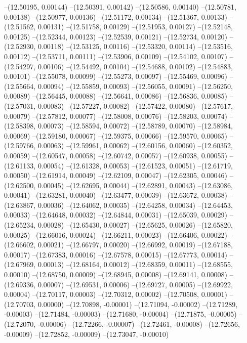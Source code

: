 --(12.50195, 0.00144)
--(12.50391, 0.00142)
--(12.50586, 0.00140)
--(12.50781, 0.00138)
--(12.50977, 0.00136)
--(12.51172, 0.00134)
--(12.51367, 0.00133)
--(12.51562, 0.00131)
--(12.51758, 0.00129)
--(12.51953, 0.00127)
--(12.52148, 0.00125)
--(12.52344, 0.00123)
--(12.52539, 0.00121)
--(12.52734, 0.00120)
--(12.52930, 0.00118)
--(12.53125, 0.00116)
--(12.53320, 0.00114)
--(12.53516, 0.00112)
--(12.53711, 0.00111)
--(12.53906, 0.00109)
--(12.54102, 0.00107)
--(12.54297, 0.00106)
--(12.54492, 0.00104)
--(12.54688, 0.00102)
--(12.54883, 0.00101)
--(12.55078, 0.00099)
--(12.55273, 0.00097)
--(12.55469, 0.00096)
--(12.55664, 0.00094)
--(12.55859, 0.00093)
--(12.56055, 0.00091)
--(12.56250, 0.00089)
--(12.56445, 0.00088)
--(12.56641, 0.00086)
--(12.56836, 0.00085)
--(12.57031, 0.00083)
--(12.57227, 0.00082)
--(12.57422, 0.00080)
--(12.57617, 0.00079)
--(12.57812, 0.00077)
--(12.58008, 0.00076)
--(12.58203, 0.00074)
--(12.58398, 0.00073)
--(12.58594, 0.00072)
--(12.58789, 0.00070)
--(12.58984, 0.00069)
--(12.59180, 0.00067)
--(12.59375, 0.00066)
--(12.59570, 0.00065)
--(12.59766, 0.00063)
--(12.59961, 0.00062)
--(12.60156, 0.00060)
--(12.60352, 0.00059)
--(12.60547, 0.00058)
--(12.60742, 0.00057)
--(12.60938, 0.00055)
--(12.61133, 0.00054)
--(12.61328, 0.00053)
--(12.61523, 0.00051)
--(12.61719, 0.00050)
--(12.61914, 0.00049)
--(12.62109, 0.00047)
--(12.62305, 0.00046)
--(12.62500, 0.00045)
--(12.62695, 0.00044)
--(12.62891, 0.00043)
--(12.63086, 0.00041)
--(12.63281, 0.00040)
--(12.63477, 0.00039)
--(12.63672, 0.00038)
--(12.63867, 0.00036)
--(12.64062, 0.00035)
--(12.64258, 0.00034)
--(12.64453, 0.00033)
--(12.64648, 0.00032)
--(12.64844, 0.00031)
--(12.65039, 0.00029)
--(12.65234, 0.00028)
--(12.65430, 0.00027)
--(12.65625, 0.00026)
--(12.65820, 0.00025)
--(12.66016, 0.00024)
--(12.66211, 0.00023)
--(12.66406, 0.00022)
--(12.66602, 0.00021)
--(12.66797, 0.00020)
--(12.66992, 0.00019)
--(12.67188, 0.00017)
--(12.67383, 0.00016)
--(12.67578, 0.00015)
--(12.67773, 0.00014)
--(12.67969, 0.00013)
--(12.68164, 0.00012)
--(12.68359, 0.00011)
--(12.68555, 0.00010)
--(12.68750, 0.00009)
--(12.68945, 0.00008)
--(12.69141, 0.00008)
--(12.69336, 0.00007)
--(12.69531, 0.00006)
--(12.69727, 0.00005)
--(12.69922, 0.00004)
--(12.70117, 0.00003)
--(12.70312, 0.00002)
--(12.70508, 0.00001)
--(12.70703, 0.00000)
--(12.70898, -0.00001)
--(12.71094, -0.00002)
--(12.71289, -0.00003)
--(12.71484, -0.00003)
--(12.71680, -0.00004)
--(12.71875, -0.00005)
--(12.72070, -0.00006)
--(12.72266, -0.00007)
--(12.72461, -0.00008)
--(12.72656, -0.00009)
--(12.72852, -0.00009)
--(12.73047, -0.00010)
